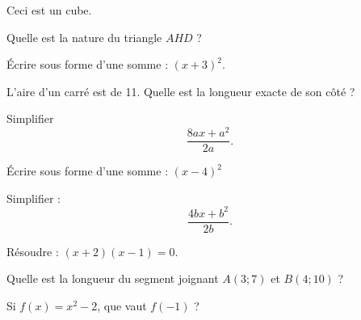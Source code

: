 \begin{MentalActivity}

\begin{mental}

    Ceci est un cube.
                
                
                
                Quelle est la nature du triangle \( AHD\) ?



\end{mental}

\begin{mental}
            Écrire sous forme d'une somme : $(x+3)^2$.
\end{mental}

\begin{mental}
            L'aire d'un carré est de \unit{11}{\centi\meter\squared}. Quelle est la longueur exacte de son côté ?
\end{mental}

\begin{mental}
            Simplifier 
            \begin{equation}
                \frac{ 8ax+a^2 }{ 2a }.
            \end{equation}
            

\end{mental}


\end{MentalActivity}
\begin{MentalActivity}

\begin{mental}
            Écrire sous forme d'une somme : \( (x-4)^2\)

\end{mental}

\begin{mental}
            Simplifier :
            \begin{equation}
                \frac{ 4bx+b^2 }{ 2b }.
            \end{equation}
\end{mental}

\begin{mental}

            Résoudre : \( (x+2)(x-1)=0\).

\end{mental}

\begin{mental}
            Quelle est la longueur du segment joignant \( A(3;7)\) et \( B(4;10)\) ?
\end{mental}

\begin{mental}
            Si \( f(x)=x^2-2\), que vaut \( f(-1)\) ?
            

    

\end{mental}


\end{MentalActivity}
